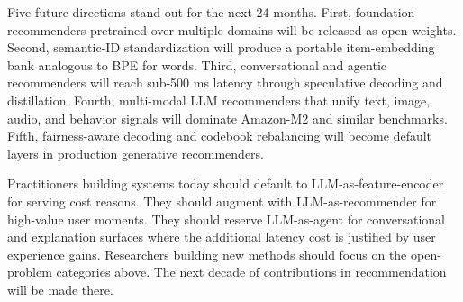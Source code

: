 \documentclass{article}
\begin{document}
Five future directions stand out for the next 24 months. First, foundation recommenders pretrained over multiple domains will be released as open weights. Second, semantic-ID standardization will produce a portable item-embedding bank analogous to BPE for words. Third, conversational and agentic recommenders will reach sub-500 ms latency through speculative decoding and distillation. Fourth, multi-modal LLM recommenders that unify text, image, audio, and behavior signals will dominate Amazon-M2 and similar benchmarks. Fifth, fairness-aware decoding and codebook rebalancing will become default layers in production generative recommenders.

Practitioners building systems today should default to LLM-as-feature-encoder for serving cost reasons. They should augment with LLM-as-recommender for high-value user moments. They should reserve LLM-as-agent for conversational and explanation surfaces where the additional latency cost is justified by user experience gains. Researchers building new methods should focus on the open-problem categories above. The next decade of contributions in recommendation will be made there.



\end{document}
